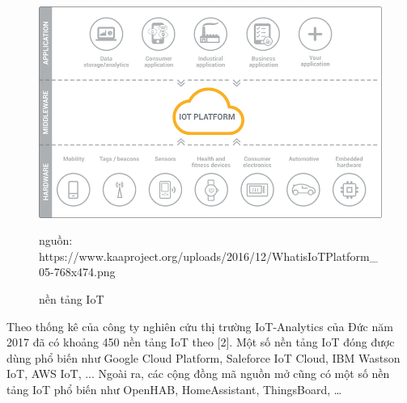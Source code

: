 \begin{figure}
	\center
	\includegraphics[scale=0.6]{image/IoTPlatform}
	\caption{nền tảng IoT}
	nguồn: https://www.kaaproject.org/uploads/2016/12/WhatisIoTPlatform\_05-768x474.png
	\label{fig:iot-platform}
\end{figure}


Theo thống kê của công ty nghiên cứu thị trường IoT-Analytics của Đức năm 2017 đã có khoảng 450 nền tảng IoT theo [2]. Một số nền tảng IoT đóng được dùng phổ biến như Google Cloud Platform, Saleforce IoT Cloud, IBM Wastson IoT, AWS IoT, ... Ngoài ra, các cộng đồng mã nguồn mở cũng có một số nền tảng IoT phổ biến như OpenHAB, HomeAssistant, ThingsBoard, …


